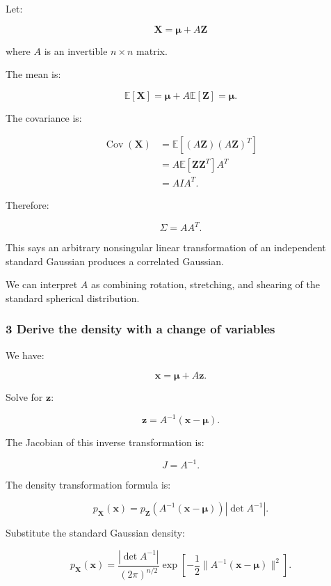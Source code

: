 Let:

\[
 \boxed{ \mathbf X=\boldsymbol\mu+A\mathbf Z }
\]

where \(A\) is an invertible \(n\times n\) matrix.

The mean is:

\[
 \mathbb E[\mathbf X] = \boldsymbol\mu+A\mathbb E[\mathbf Z] =\boldsymbol\mu.
\]

The covariance is:

\[
 \begin{aligned} \operatorname{Cov}(\mathbf X) &= \mathbb E[ (A\mathbf Z)(A\mathbf Z)^T ]\\ &= A\mathbb E[\mathbf Z\mathbf Z^T]A^T\\ &=AIA^T. \end{aligned}
\]

Therefore:

\[
 \boxed{\Sigma=AA^T}.
\]

This says an arbitrary nonsingular linear transformation of an independent standard Gaussian produces a correlated Gaussian.

We can interpret \(A\) as combining rotation, stretching, and shearing of the standard spherical distribution.

\subsubsection{3 Derive the density with a change of variables}\label{02-foundations-ii-ch024-derive-the-density-with-a-change-of-variables}

\hypertarget{02-foundations-ii-ch024-derive-the-density-with-a-change-of-variables}{}

We have:

\[
 \mathbf x=\boldsymbol\mu+A\mathbf z.
\]

Solve for \(\mathbf z\):

\[
 \mathbf z=A^{-1}(\mathbf x-\boldsymbol\mu).
\]

The Jacobian of this inverse transformation is:

\[
 J=A^{-1}.
\]

The density transformation formula is:

\[
 p_{\mathbf X}(\mathbf x) = p_{\mathbf Z}(A^{-1}(\mathbf x-\boldsymbol\mu)) |\det A^{-1}|.
\]

Substitute the standard Gaussian density:

\[
 p_{\mathbf X}(\mathbf x) = \frac{|\det A^{-1}|}{(2\pi)^{n/2}} \exp\left[ -\frac12 \|A^{-1}(\mathbf x-\boldsymbol\mu)\|^2 \right].
\]

